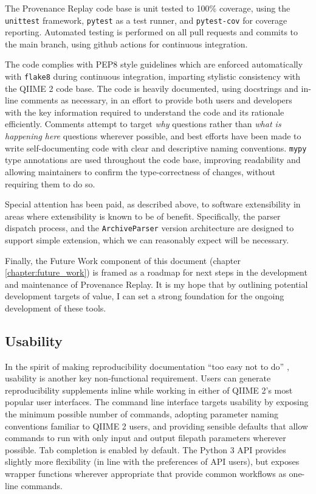 The Provenance Replay code base is unit tested to 100\% coverage, using
the \texttt{unittest} \parencite{python_software_foundation_unittest_2001} framework,
\texttt{pytest} \parencite{krekel_pytest_2015} as a test runner, and \texttt{pytest-cov} \parencite{pytest-cov_contributors_welcome_2016}
for coverage reporting. Automated testing is performed on all pull requests and
commits to the main branch, using github actions
\parencite{github_features_2022} for continuous integration.

The code complies with PEP8 style guidelines \parencite{van_rossum_pep_2001}
which are enforced automatically with \texttt{flake8} during continuous integration,
imparting stylistic consistency with the QIIME 2 code base. The code is heavily
documented, using docstrings and in-line comments as necessary, in an effort to
provide both users and developers with the key information required to
understand the code and its rationale efficiently. Comments attempt to target
\textit{why} questions rather than \textit{what is happening here} questions
wherever possible, and best efforts have been made to write self-documenting
code with clear and descriptive naming conventions. \texttt{mypy} type annotations
\parencite{lehtosalo_mypy_2014} are used throughout the code base, improving
readability and allowing maintainers to confirm the type-correctness of changes,
without requiring them to do so.

Special attention has been paid, as described above, to software extensibility
in areas where extensibility is known to be of benefit. Specifically, the parser
dispatch process, and the \texttt{ArchiveParser} version architecture are designed to
support simple extension, which we can reasonably expect will be necessary. 

Finally, the Future Work component of this document (chapter \ref{chapter:future_work})
is framed as a roadmap for next steps in the development and maintenance of
Provenance Replay. It is my hope that by outlining potential development targets
of value, I can set a strong foundation for the ongoing development of these
tools.


\subsection{Usability}

In the spirit of making reproducibility documentation “too easy not to do” \parencite[19]{whitaker_turing_2019},
usability is another key non-functional requirement. Users can generate
reproducibility supplements inline while working in either of QIIME 2’s most
popular user interfaces. The command line interface targets usability by
exposing the minimum possible number of commands, adopting parameter naming
conventions familiar to QIIME 2 users, and providing sensible defaults that
allow commands to run with only input and output filepath parameters wherever
possible. Tab completion is enabled by default. The Python 3 API provides
slightly more flexibility (in line with the preferences of API users), but
exposes wrapper functions wherever appropriate that provide common workflows as
one-line commands.

